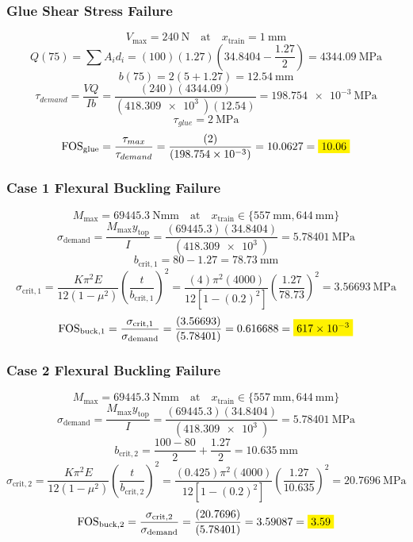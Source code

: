 \documentclass[11pt, fleqn]{article}
\newcommand{\mathhl}[1]{\colorbox{yellow}{$\displaystyle #1$}}
\begin{document}
\subsubsection{Glue Shear Stress Failure}
\[ V_{\mathrm{max}} = \SI{240}{\N} \quad \text{at} \quad x_{\mathrm{train}} = \SI{1}{\mm} \]
\[ Q(75) = \sum{A_id_i} = (100)(1.27)\left(34.8404-\frac{1.27}{2}\right) = \SI{4344.09}{\MPa} \]
\[ b(75) = 2(5+1.27) = \SI{12.54}{\mm} \]
\[ \tau_{demand} = \frac{VQ}{Ib} = \frac{(240)(4344.09)}{(\SI{418.309e3}{})(12.54)} = \SI{198.754e-3}{\MPa} \]
\[ \tau_{glue} = \SI{2}{\MPa}\]
\[ {\mathrm{FOS}}_{\mathrm{glue}} = \frac{\tau_{max}}{\tau_{demand}} = \frac{(2)}{(\SI{198.754e-3}{})} = 10.0627 = \mathhl{10.06} \]

\subsubsection{Case 1 Flexural Buckling Failure}
\[ M_{\mathrm{max}} = \SI{69445.3}{\N\mm} \quad \text{at} \quad x_{\mathrm{train}} \in \{\SI{557}{\mm},\SI{644}{\mm}\} \]
\[ \sigma_{\mathrm{demand}} = \frac{M_{\mathrm{max}}y_{\mathrm{top}}}{I} = \frac{(69445.3)(34.8404)}{(\SI{418.309e3}{})} = \SI{5.78401}{\MPa} \]
\[ b_{\mathrm{crit,1}} = 80-1.27 = \SI{78.73}{\mm} \]
\[ \sigma_{\mathrm{crit,1}} = \frac{K\pi^2E}{12\left(1-\mu^2\right)}\left(\frac{t}{b_{\mathrm{crit,1}}}\right)^2 = \frac{\left(4\right)\pi^2\left(4000\right)}{12\left[1-\left(0.2\right)^2\right]}\left(\frac{1.27}{78.73}\right)^2 = \SI{3.56693}{\MPa} \]
\[ {\mathrm{FOS}}_{\mathrm{buck,1}} = \frac{\sigma_{\mathrm{crit,1}}}{\sigma_{\mathrm{demand}}} = \frac{(3.56693)}{(5.78401)} = 0.616688 = \mathhl{\SI{617e-3}{}} \]

\subsubsection{Case 2 Flexural Buckling Failure}
\[ M_{\mathrm{max}} = \SI{69445.3}{\N\mm} \quad \text{at} \quad x_{\mathrm{train}} \in \{\SI{557}{\mm},\SI{644}{\mm}\} \]
\[ \sigma_{\mathrm{demand}} = \frac{M_{\mathrm{max}}y_{\mathrm{top}}}{I} = \frac{(69445.3)(34.8404)}{(\SI{418.309e3}{})} = \SI{5.78401}{\MPa} \]
\[ b_{\mathrm{crit,2}} = \frac{100-80}{2}+\frac{1.27}{2} = \SI{10.635}{\mm} \]
\[ \sigma_{\mathrm{crit,2}} = \frac{K\pi^2E}{12\left(1-\mu^2\right)}\left(\frac{t}{b_{\mathrm{crit,2}}}\right)^2 = \frac{\left(0.425\right)\pi^2\left(4000\right)}{12\left[1-\left(0.2\right)^2\right]}\left(\frac{1.27}{10.635}\right)^2 = \SI{20.7696}{\MPa} \]
\[ {\mathrm{FOS}}_{\mathrm{buck,2}} = \frac{\sigma_{\mathrm{crit,2}}}{\sigma_{\mathrm{demand}}} = \frac{(20.7696)}{(5.78401)} = 3.59087 = \mathhl{3.59} \]
\end{document}
